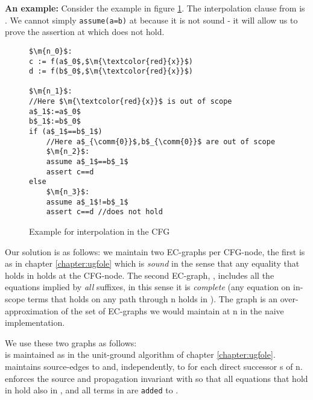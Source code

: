 \textbf{An example:}
Consider the example in figure \ref{example_scoping_DAG_interpolation.0}.
The interpolation clause from  is .
We cannot simply \lstinline|assume(a=b)| at  because it is not sound - it will allow us to prove the assertion at  which does not hold.


\begin{figure}
\begin{lstlisting}
$\m{n_0}$:
c := f(a$_0$,$\m{\textcolor{red}{x}}$)
d := f(b$_0$,$\m{\textcolor{red}{x}}$)

$\m{n_1}$:
//Here $\m{\textcolor{red}{x}}$ is out of scope
a$_1$:=a$_0$
b$_1$:=b$_0$
if (a$_1$==b$_1$)
	//Here a$_{\comm{0}}$,b$_{\comm{0}}$ are out of scope
	$\m{n_2}$:
	assume a$_1$==b$_1$
	assert c==d
else	
	$\m{n_3}$:
	assume a$_1$!=b$_1$
	assert c==d //does not hold
\end{lstlisting}
\caption{Example for interpolation in the CFG}
\label{example_scoping_DAG_interpolation.0}
\end{figure}

Our solution is as follows: we maintain two EC-graphs per CFG-node, the first is  as in chapter \ref{chapter:ugfole} which is \emph{sound} in the sense that any equality that holds in  holds at the CFG-node. The second EC-graph, , includes all the equations implied by \emph{all} suffixes, in this sense it is \emph{complete} (any equation on in-scope terms that holds on any path through n holds in ). 
The graph  is an over-approximation of the set of EC-graphs we would maintain at n in the naive implementation.

We use these two graphs as follows:\\
 is maintained as in the unit-ground algorithm of chapter \ref{chapter:ugfole}.\\
 maintains source-edges to  and, independently, to  for each direct successor s of n.  enforces the source and propagation invariant with  so that all equations that hold in  hold also in , and all terms in  are \lstinline|added| to .

